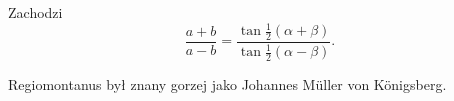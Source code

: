 \begin{proposition}
%
    Zachodzi
    \begin{equation}
        \frac{a + b}{a- b} = \frac{\tan \frac 1 2 (\alpha + \beta)}{\tan \frac 1 2 (\alpha - \beta)}.
    \end{equation}
\end{proposition}

Regiomontanus był znany gorzej jako Johannes Müller von Königsberg.
%
%
